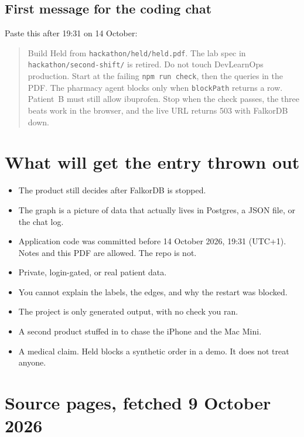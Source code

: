 \documentclass[11pt,a4paper]{article}
\newcommand{\code}[1]{\texttt{#1}}
\newcommand{\file}[1]{\texttt{#1}}
\begin{document}
\subsection{First message for the coding chat}

Paste this after 19:31 on 14 October:

\begin{quote}
\small
Build Held from \file{hackathon/held/held.pdf}.
The lab spec in \file{hackathon/second-shift/} is retired.
Do not touch DevLearnOps production.
Start at the failing \code{npm run check}, then the queries in the PDF.
The pharmacy agent blocks only when \code{blockPath} returns a row.
Patient~B must still allow ibuprofen.
Stop when the check passes, the three beats work in the browser, and the live URL returns 503 with FalkorDB down.
\end{quote}

\section{What will get the entry thrown out}

\begin{itemize}
  \item The product still decides after FalkorDB is stopped.
  \item The graph is a picture of data that actually lives in Postgres, a JSON file, or the chat log.
  \item Application code was committed before 14 October 2026, 19:31 (UTC+1). Notes and this PDF are allowed. The repo is not.
  \item Private, login-gated, or real patient data.
  \item You cannot explain the labels, the edges, and why the restart was blocked.
  \item The project is only generated output, with no check you ran.
  \item A second product stuffed in to chase the iPhone and the Mac Mini.
  \item A medical claim. Held blocks a synthetic order in a demo. It does not treat anyone.
\end{itemize}

\section{Source pages, fetched 9 October 2026}
\end{document}

